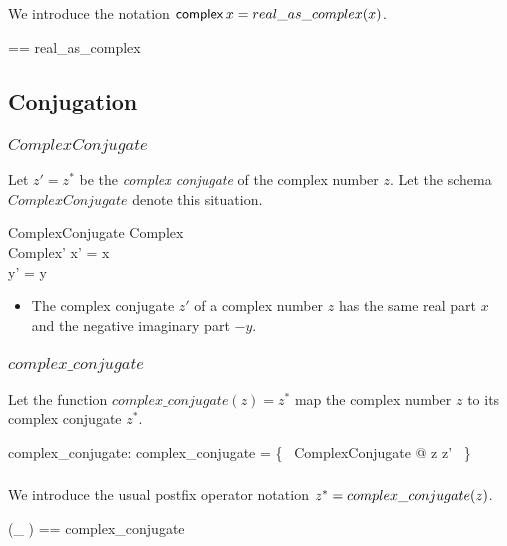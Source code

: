\documentclass[11pt, oneside]{article}
\begin{document}
We introduce the notation $\operatorname{\mathsf{complex}} x = real\_as\_complex(x)$.

\begin{zed}
	\asRC == real\_as\_complex
\end{zed}

\subsection{Conjugation}

\subsubsection{$ComplexConjugate$}

Let $z' = z^*$ be the \textit{complex conjugate} of the complex number $z$.
Let the schema $ComplexConjugate$ denote this situation.

\begin{schema}{ComplexConjugate}
	Complex \\
	Complex'
\where
	x' = x \\
	y' = \negR y
\end{schema}
\begin{itemize}
\item The complex conjugate $z'$ of a complex number $z$ has the same real part $x$ 
and the negative imaginary part $-y$.
\end{itemize}

\subsubsection{$complex\_conjugate$}

Let the function $complex\_conjugate(z) = z^*$ map the complex number $z$ to its complex conjugate $z^*$.

\begin{axdef}
	complex\_conjugate: \C \fun \C
\where
	complex\_conjugate = \{~ ComplexConjugate @ z \mapsto z' ~\}
\end{axdef}

\subsubsection{}

We introduce the usual postfix operator notation $z^* = complex\_conjugate(z)$.

\begin{zed}
	(\_ \conjC) == complex\_conjugate
\end{zed}
\end{document}
